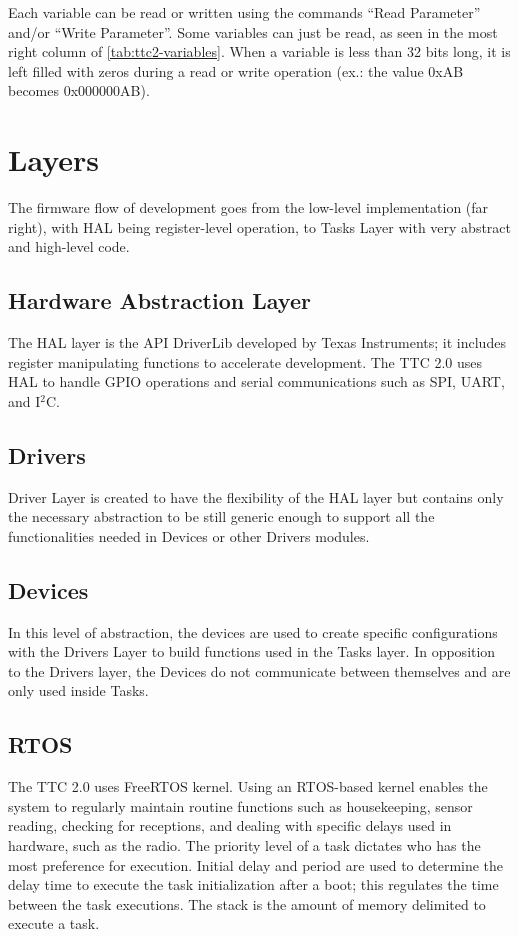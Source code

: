 Each variable can be read or written using the commands ``Read Parameter'' and/or ``Write Parameter''. Some variables can just be read, as seen in the most right column of \autoref{tab:ttc2-variables}. When a variable is less than 32 bits long, it is left filled with zeros during a read or write operation (ex.: the value 0xAB becomes 0x000000AB).

\section{Layers}

The firmware flow of development goes from the low-level implementation (far right), with HAL being register-level operation, to Tasks Layer with very abstract and high-level code.

\subsection{Hardware Abstraction Layer}

The HAL layer is the API DriverLib developed by Texas Instruments; it includes register manipulating functions to accelerate development. The TTC 2.0 uses HAL to handle GPIO operations and serial communications such as SPI, UART, and I$^2$C.

\subsection{Drivers}

Driver Layer is created to have the flexibility of the HAL layer but contains only the necessary abstraction to be still generic enough to support all the functionalities needed in Devices or other Drivers modules.

\subsection{Devices}

In this level of abstraction, the devices are used to create specific configurations with the Drivers Layer to build functions used in the Tasks layer. In opposition to the Drivers layer, the Devices do not communicate between themselves and are only used inside Tasks.

\subsection{RTOS}

The TTC 2.0 uses FreeRTOS kernel. Using an RTOS-based kernel enables the system to regularly maintain routine functions such as housekeeping, sensor reading, checking for receptions, and dealing with specific delays used in hardware, such as the radio. The priority level of a task dictates who has the most preference for execution. Initial delay and period are used to determine the delay time to execute the task initialization after a boot; this regulates the time between the task executions. The stack is the amount of memory delimited to execute a task.

